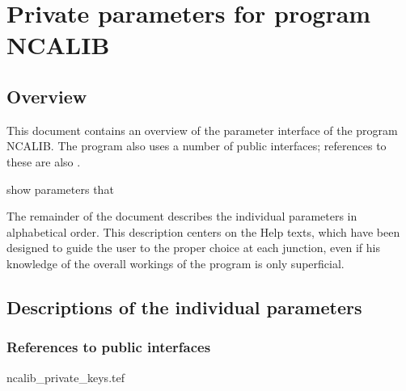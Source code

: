 
\chapter{ Private parameters for program NCALIB}
\tableofcontents


\section{ Overview}

	This document contains an overview of the parameter interface of the
program NCALIB. The program also uses a number of public interfaces; references
to these are also .

show %
parameters that %


	The remainder of the document describes the individual parameters in
alphabetical order. This description centers on the Help texts, which have been
designed to guide the user to the proper choice at each junction, even if his
knowledge of the overall workings of the program is only superficial.


\section{ Descriptions of the individual parameters}
\label{.descriptions}

\subsection{ References to public interfaces}
\label{.public}

 {ncalib_private_keys.tef}
